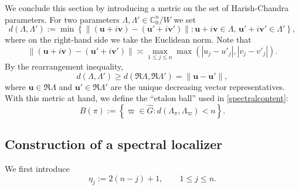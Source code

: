 \documentclass[11pt,oneside]{amsart}
\numberwithin{equation}{section}
\theoremstyle{remark}
\theoremstyle{plain}
\newcommand\CC{\mathbb{C}}
\newcommand{\bu}{\mathbf{u}}
\newcommand{\bv}{\mathbf{v}}
\renewcommand\leq{\leqslant}
\renewcommand\geq{\geqslant}
\begin{document}
We conclude this section by introducing a metric on the set of Harish-Chandra parameters. For two parameters $\Lambda,\Lambda'\in\CC^n_0/W$ we set 
\[d(\Lambda,\Lambda'):= \min\left\{\|(\bu+i\bv)-(\bu'+i\bv')\|: \bu+i\bv \in \Lambda ,\, \bu'+i\bv' \in \Lambda'\right\},\]
where on the right-hand side we take the Euclidean norm. Note that
\begin{equation}\label{eq:parameter-distance-note}
\|(\bu+i\bv)-(\bu'+i\bv')\|\asymp \max_{1\leq j\leq n} \max\left(|u_j-u'_j|, |v_j-v'_j|\right).
\end{equation}
By the rearrangement inequality,
\begin{equation}\label{eq:parameter-distance-note2}
d(\Lambda,\Lambda') \geq d(\Re\Lambda,\Re\Lambda') = \|\bu-\bu'\|,
\end{equation}
where $\bu\in\Re\Lambda$ and $\bu'\in\Re\Lambda'$ are the unique decreasing vector representatives. With this metric at hand, we define the ``etalon ball'' used in \eqref{spectralcontent}:
\begin{equation}\label{eq:def-unit-ball-in-dual}
B(\pi):=\left\{\varpi\in\widehat{G}:d(\Lambda_{\pi},\Lambda_{\varpi}) < n\right\}.
\end{equation}

\subsection{Construction of a spectral localizer}
We first introduce
\[
\eta_j:=2(n-j)+1, \qquad 1\leq j\leq n.
\]
\end{document}
